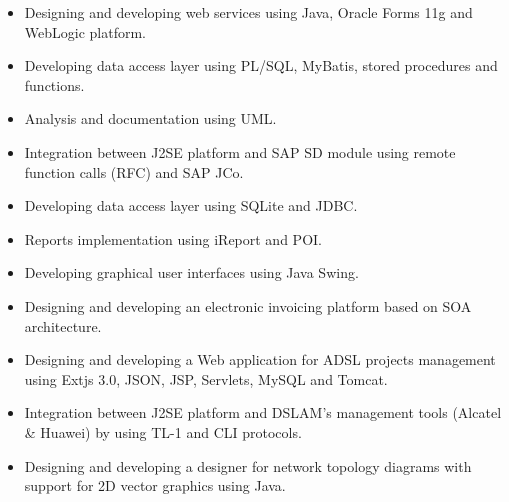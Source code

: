 \documentclass[10pt,a4paper,ragged2e]{altacv}
\begin{document}
\vspace{5px}
\divider
\vspace{5px}

\begin{itemize}
   \item Designing and developing web services using Java, Oracle Forms 11g and WebLogic platform.
   \item Developing data access layer using  PL/SQL, MyBatis, stored procedures and functions.
   \item Analysis and documentation using UML.
\end{itemize}

\vspace{5px}
\divider
\vspace{5px}

\begin{itemize}
   \item Integration between J2SE platform and SAP SD module using remote function calls (RFC) and SAP JCo.
   \item Developing data access layer using SQLite and JDBC.
   \item Reports implementation using iReport and POI.
   \item Developing graphical user interfaces using Java Swing.
   \item Designing and developing an electronic invoicing platform based on SOA architecture.
\end{itemize}

\vspace{5px}
\divider
\vspace{5px}

\begin{itemize}
   \item Designing and developing a Web application for ADSL projects management using Extjs 3.0, JSON, JSP, Servlets, MySQL and Tomcat.
   \item Integration between J2SE platform and DSLAM's management tools (Alcatel \& Huawei) by using TL-1 and CLI protocols.
   \item Designing and developing a designer for network topology diagrams with support for 2D vector graphics using Java.
\end{itemize}
\end{document}
